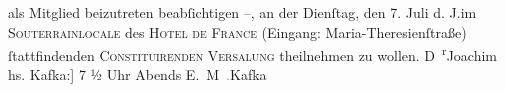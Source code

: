 \begin{ledgroupsized}[t]{13cm}
           \noindent{}als Mitglied beizutreten beabſichtigen –, an der Dienſtag, den 7.
                  Juli d. J.im \textsc{Souterrainlocale} des \textsc{Hotel de France} (Eingang: Maria-Theresienſtraße){ }ſtattfindenden \pend
           \pstart
           \centering{}\textsc{Constituirenden Versa{\geminationm}lung }\pend
           \pstart
           \noindent{}theilnehmen zu wollen.\pend
           \pstart \spacefill\mbox{D \textsuperscript{r}Joachim}\pend{}\pstart
           \noindent{}\centering{}{[}hs. Kafka:{]} 7 ½ Uhr Abends\pend
           \pstart \spacefill\mbox{E. M \textcolor{gray}{.}Kafka}\pend{}\pstart
           \noindent{}\label{T_L00022-1v}\label{T_L00022-1h}\pend
           
         
         \endnumbering{}\end{ledgroupsized}  \newcommand{\dateiname}{L00022}\newcommand{\titel}{Jaques Joachim und Eduard Michael Kafka an Arthur Schnitzler, 6. 7. 1891}\newcommand{\editorInnen}{Martin Anton Müller und Gerd-Hermann Susen}
      